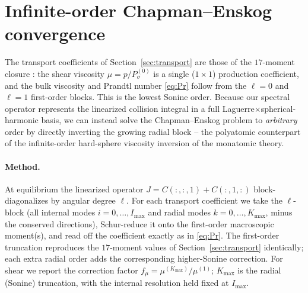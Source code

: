 \section{Infinite-order Chapman--Enskog convergence}
\label{sec:ce}

The transport coefficients of Section~\ref{sec:transport} are those of the $17$-moment closure
\cite[eqs.~(35)--(39)]{Djordjic2023}: the shear viscosity $\mu=p/P_\sigma^{(0)}$ is a single ($1\times1$)
production coefficient, and the bulk viscosity and Prandtl number \eqref{eq:Pr} follow from the
$\ell=0$ and $\ell=1$ first-order blocks. This is the lowest Sonine order. Because our spectral operator
represents the linearized collision integral in a full Laguerre$\times$spherical-harmonic basis, we can
instead solve the Chapman--Enskog problem to \emph{arbitrary} order by directly inverting the growing
radial block -- the polyatomic counterpart of the infinite-order hard-sphere viscosity inversion of the
monatomic theory.

\paragraph{Method.}
At equilibrium the linearized operator $J=C(:,:,1)+C(:,1,:)$ block-diagonalizes by angular degree
$\ell$. For each transport coefficient we take the $\ell$-block (all internal modes $i=0,\dots,I_{\max}$
and radial modes $k=0,\dots,K_{\max}$, minus the conserved directions), Schur-reduce it onto the
first-order macroscopic moment(s), and read off the coefficient exactly as in \eqref{eq:Pr}. The
first-order truncation reproduces the $17$-moment values of Section~\ref{sec:transport} identically; each
extra radial order adds the corresponding higher-Sonine correction. For shear we report the correction
factor $f_\mu=\mu^{(K_{\max})}/\mu^{(1)}$; $K_{\max}$ is the radial (Sonine) truncation, with the internal
resolution held fixed at $I_{\max}$.

